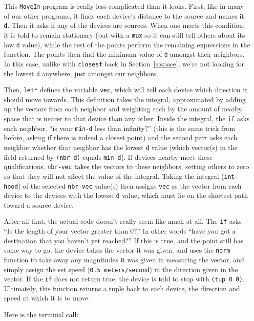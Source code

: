 \documentclass{article}
\newcommand\var[1]{{\tt #1}}
\begin{document}
This \var{MoveIn} program is really less complicated than it looks.
First, like in many of our other programs, it finds each device's
distance to the source and names it \var{d}.  Then it asks if any of
the devices are sources.  When one meets this condition, it is told to
remain stationary (but with a \var{mux} so it can still tell others
about its low \var{d} value), while the rest of the points perform the
remaining expressions in the function.  The points then find the
minimum value of \var{d} amongst their neighbors.  In this case,
unlike with \var{closest} back in Section~\ref{s:space}, we're not
looking for the lowest \var{d} anywhere, just amongst our neighbors.

Then, \var{let*} defines the variable \var{vec}, which will tell each
device which direction it should move towards.  This definition takes
the integral, approximated by adding up the vectors from each neighbor
and weighting each by the amount of nearby space that is nearer to
that device than any other.  Inside the integral, the \var{if} asks
each neighbor, ``is your \var{min-d} less than infinity?'' (this is the
same trick from before, asking if there is indeed a closest point) and
the second part asks each neighbor whether that neighbor has the
lowest \var{d} value (which vector(s) in the field returned by
\var{(nbr d)} equals \var{min-d}).  If devices nearby meet these
qualifications, \var{nbr-vec} takes the vectors to these neighbors,
setting others to zero so that they will not affect the value of the
integral.  Taking the integral (\var{int-hood}) of the selected
\var{nbr-vec} value(s) then assigns \var{vec} as the vector from each
device to the devices with the lowest \var{d} value, which must lie on
the shortest path toward a source device.

After all that, the actual code doesn't really seem like much at all.
The \var{if} asks ``Is the length of your vector greater than 0?''  In
other words ``have you got a destination that you haven't yet
reached?''  If this is true, and the point still has some way to go,
the device takes the vector it was given, and uses the \var{norm}
function to take away any magnitudes it was given in measuring the
vector, and simply assign the set speed (\var{0.5 meters/second}) in
the direction given in the vector.  If the \var{if} does not return
true, the device is told to stop with \var{(tup 0 0)}.  Ultimately,
this function returns a tuple back to each device, the direction and
speed at which it is to move.

Here is the terminal call:
\end{document}
